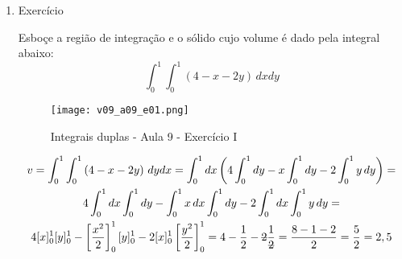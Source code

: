 \begin{enumerate}
	\item Exercício
	
	Esboçe a região de integração e o sólido cujo volume é dado pela integral abaixo:
	\begin{equation*}
		\int_0^1 \int_0^1 \left(4 - x - 2y\right)\, dx dy
	\end{equation*} 
		
	\begin{figure}[htb]
		\caption{Integrais duplas - Aula 9 - Exercício I}
		\label{v09_a09_e01}
		\centering
		\texttt{[image: v09\_a09\_e01.png]}		
	\end{figure}
	
	\begin{gather*}
		v = \int_0^1 \int_0^1 \left(4 - x - 2y\right)\, dy dx = \int_0^1 dx \left(4\int_0^1 dy - x\int_0^1 dy - 2\int_0^1 y\, dy\right) =\\ 4\int_0^1 dx \int_0^1 dy - \int_0^1 x\, dx \int_0^1 dy - 2\int_0^1 dx \int_0^1 y\, dy =\\ 4[x]_0^1 [y]_0^1 - \left[\dfrac{x^2}{2}\right]_0^1 [y]_0^1 - 2[x]_0^1 \left[\dfrac{y^2}{2}\right]_0^1 = 4 - \dfrac{1}{2} - \overstrike{2}\dfrac{1}{\overstrike{2}} = \frac{8 - 1 - 2}{2} = \dfrac{5}{2} = 2,5	
	\end{gather*}	
\end{enumerate}